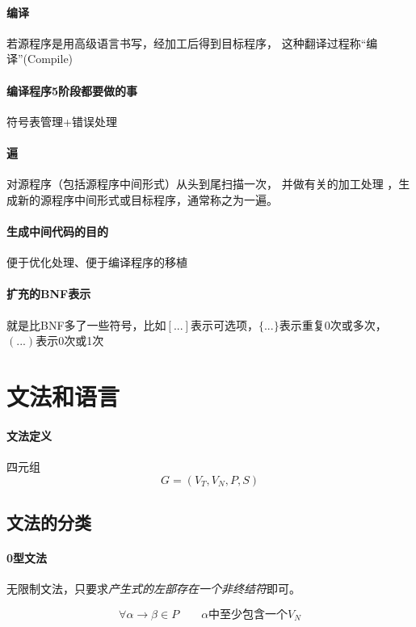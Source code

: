 \documentclass[UTF8]{ctexart} %
\begin{document}
\paragraph{编译} 若源程序是用高级语言书写，经加工后得到目标程序， 这种翻译过程称“编译”(Compile)

\paragraph{编译程序5阶段都要做的事} 符号表管理+错误处理

\paragraph{遍} 对源程序（包括源程序中间形式）从头到尾扫描一次， 并做有关的加工处理 ，生成新的源程序中间形式或目标程序，通常称之为一遍。

\paragraph{生成中间代码的目的} 便于优化处理、便于编译程序的移植

\paragraph{扩充的BNF表示} 就是比BNF多了一些符号，比如$[...]$表示可选项，$\{...\}$表示重复0次或多次，$(...)$表示0次或1次

\section{文法和语言}

\paragraph{文法定义} 四元组
\begin{equation}
    G=(V_T,V_N,P,S)
\end{equation}
\subsection{文法的分类}

\paragraph{0型文法} 无限制文法，只要求\emph{产生式的左部存在一个非终结符}即可。

\begin{equation}
    \forall \alpha \rightarrow \beta \in P \qquad \alpha\text{中至少包含一个}V_N
\end{equation}
\end{document}
